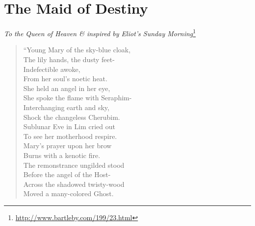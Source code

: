 \section{The Maid of Destiny}

\emph{To the Queen of Heaven \& inspired by Eliot's Sunday Morning}\footnote{\url{http://www.bartleby.com/199/23.html}}

\begin{verse}
``Young Mary of the sky-blue cloak,\\
The lily hands, the dusty feet-\\
Indefectible awoke,\\
From her soul's noetic heat.\\
She held an angel in her eye,\\
She spoke the flame with Seraphim-\\
Interchanging earth and sky,\\
Shock the changeless Cherubim.\\
Sublunar Eve in Lim cried out\\
To see her motherhood respire.\\
Mary's prayer upon her brow\\
Burns with a kenotic fire.\\
The remonstrance ungilded stood\\
Before the angel of the Host-\\
Across the shadowed twisty-wood\\
Moved a many-colored Ghost.


\end{verse}
